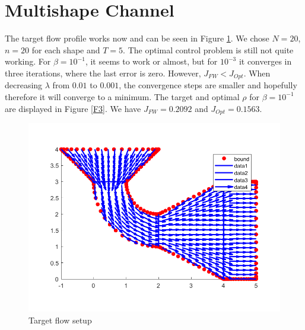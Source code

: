 \documentclass[11pt, a4paper]{article}
\theoremstyle{definition}
\begin{document}
\section{Multishape Channel}
The target flow profile works now and can be seen in Figure \ref{F2}. We chose $N = 20$, $n = 20$ for each shape and $T = 5$. 
The optimal control problem is still not quite working. For $\beta = 10^{-1}$, it seems to work or almost, but for $10^{-3}$ it converges in three iterations, where the last error is zero. However, $J_{FW} < J_{Opt}$. When decreasing $\lambda$ from $0.01$ to $0.001$, the convergence steps are smaller and hopefully therefore it will converge to a minimum. The target and optimal $\rho$ for $\beta = 10^{-1}$ are displayed in Figure \ref{F3}. We have $J_{FW} = 0.2092$ and $J_{Opt} = 0.1563$.
\begin{figure}[h]
	\centering
	\includegraphics[scale=0.35]{S1.png}
	\caption{Target flow setup} 
	\label{F2}
\end{figure}
\end{document}
